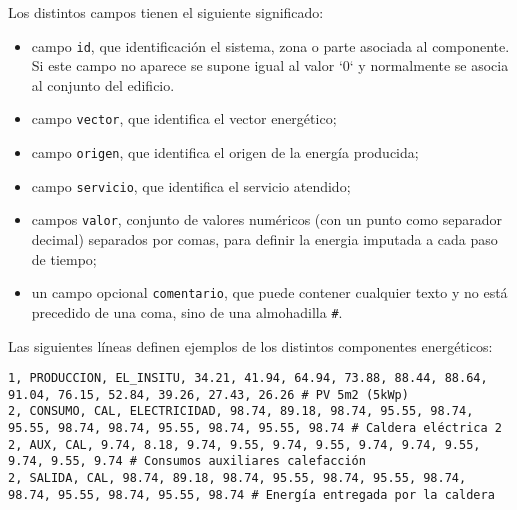 \documentclass[10pt,notitlepage,oneside,a4paper]{article}
\begin{document}
Los distintos campos tienen el siguiente significado:

\begin{itemize}
\item campo \texttt{id}, que identificación el sistema, zona o parte asociada al componente. Si este campo no aparece se supone igual al valor `0` y normalmente se asocia al conjunto del edificio.
\item campo \texttt{vector}, que identifica el vector energético;
\item campo \texttt{origen}, que identifica el origen de la energía producida;
\item campo \texttt{servicio}, que identifica el servicio atendido;
\item campos \texttt{valor}, conjunto de valores numéricos (con un punto como separador decimal) separados por comas, para definir la energia imputada a cada paso de tiempo;
\item un campo opcional \texttt{comentario}, que puede contener cualquier texto y no está precedido de una coma, sino de una almohadilla \texttt{\#}.
\end{itemize}

Las siguientes líneas definen ejemplos de los distintos componentes energéticos:

\begin{lstlisting}
1, PRODUCCION, EL_INSITU, 34.21, 41.94, 64.94, 73.88, 88.44, 88.64, 91.04, 76.15, 52.84, 39.26, 27.43, 26.26 # PV 5m2 (5kWp)
2, CONSUMO, CAL, ELECTRICIDAD, 98.74, 89.18, 98.74, 95.55, 98.74, 95.55, 98.74, 98.74, 95.55, 98.74, 95.55, 98.74 # Caldera eléctrica 2
2, AUX, CAL, 9.74, 8.18, 9.74, 9.55, 9.74, 9.55, 9.74, 9.74, 9.55, 9.74, 9.55, 9.74 # Consumos auxiliares calefacción
2, SALIDA, CAL, 98.74, 89.18, 98.74, 95.55, 98.74, 95.55, 98.74, 98.74, 95.55, 98.74, 95.55, 98.74 # Energía entregada por la caldera
\end{lstlisting}
\end{document}

